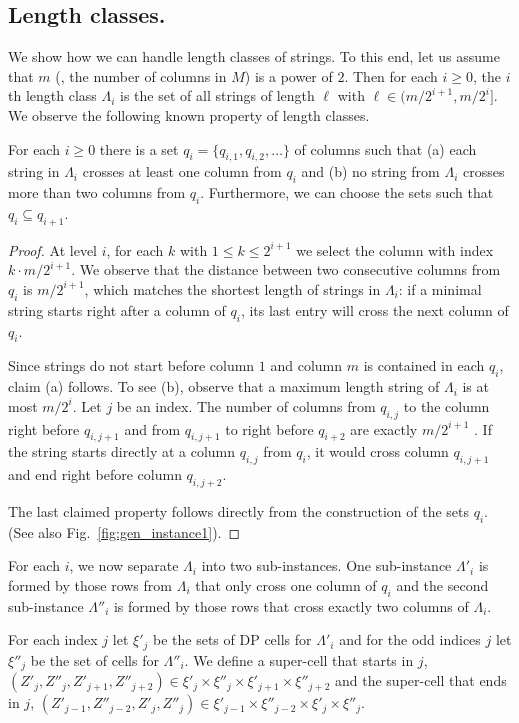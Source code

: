 \subsection{Length classes.}\label{sec:length-classes}
We show how we can handle length classes of strings.
To this end, let us assume \WLOG that $m$ (\ie, the number of columns in $M$) is a power of $2$.
Then for each $i \ge 0$, the $i$th length class $\Lambda_i$ is the set of all strings of length $\ell$ with $\ell \in (m/2^{i+1}, m/2^{i}]$. 
We observe the following known property of length classes.
\begin{lemma}\label{lem:half}
    For each $i \ge 0$ there is a set $q_i = \{q_{i,1},q_{i,2},\dotsc\}$ of columns such that (a) each string in $\Lambda_i$ crosses at least one column from $q_i$ and (b) no string from $\Lambda_i$ crosses more than two columns from $q_i$.
    Furthermore, we can choose the sets such that $q_i \subseteq q_{i+1}$.
\end{lemma}
\begin{proof}
    At level $i$, for each $k$ with $1 \le k \le 2^{i+1}$ we select the column with index $k \cdot m/2^{i+1}$.
    We observe that the distance between two consecutive columns from $q_i$ is $m/2^{i+1}$, which matches the shortest length of strings in $\Lambda_i$: 
    if a minimal string starts right after a column of $q_i$, its last entry will cross the next column of $q_i$. 

    Since strings do not start before column $1$ and column $m$ is contained in each $q_i$, claim (a) follows.
    To see (b), observe that a maximum length string of $\Lambda_i$ is at most $m/2^i$.
    Let $j$ be an index. 
    The number of columns from $q_{i,j}$ to the column right before $q_{i,j+1}$ and from $q_{i,j+1}$ to right before $q_{i+2}$ are exactly $m/2^{i+1}$ .
    If the string starts directly at a column $q_{i,j}$ from $q_i$, it would cross column $q_{i,j+1}$ and end right before column $q_{i,j+2}$.
    
    The last claimed property follows directly from the construction of the sets $q_i$. 
    (See also Fig.~\ref{fig:gen_instance1}).
\end{proof}

For each $i$, we now separate $\Lambda_i$ into two sub-instances.
One sub-instance $\Lambda'_i$ is formed by those rows from $\Lambda_i$ that only cross one column of $q_i$ and the second sub-instance $\Lambda''_i$ is formed by those rows that cross exactly two columns of $\Lambda_i$.

\begin{definition}
    For each index $j$ let $\xi'_j$ be the sets of DP cells for $\Lambda'_i$ and for the odd indices $j$ let $\xi''_j$ be the set of cells for $\Lambda''_i$.
    We define a super-cell that starts in $j$, $(Z'_j,Z''_j,Z'_{j+1},Z''_{j+2}) \in \xi'_j \times \xi''_j \times \xi'_{j+1} \times \xi''_{j+2}$ and the super-cell that ends in $j$, $(Z'_{j-1},Z''_{j-2},Z'_j,Z''_j) \in \xi'_{j-1} \times \xi''_{j-2} \times \xi'_{j} \times \xi''_{j}$.
    \label{def:dp-whole-length-class}
\end{definition}



